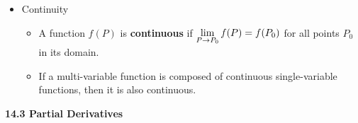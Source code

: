 \begin{itemize}
  \item Continuity
  
    \begin{itemize}
      \item A function $f(P)$ is \textbf{continuous} if $\displaystyle \lim_{P\to P_0}f(P) = f(P_0)$ for all points $P_0$ in its domain.
      \item If a multi-variable function is composed of continuous single-variable functions, then it is also continuous.
    \end{itemize}
  
  

\end{itemize}

\newpage

\centerline{\bf 14.3 Partial Derivatives}

